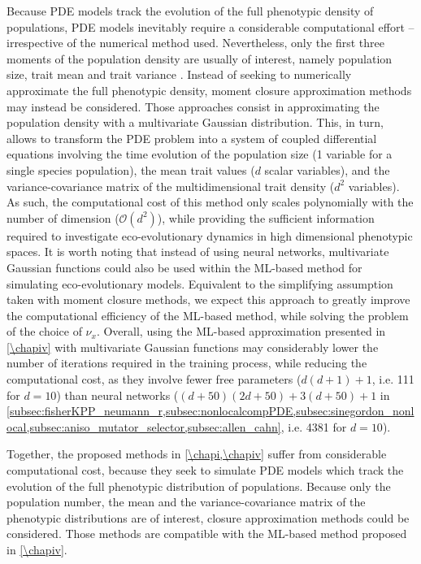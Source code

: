 Because PDE models track the evolution of the full phenotypic density of populations, PDE models inevitably require a considerable computational effort -- irrespective of the numerical method used. 
% 
Nevertheless, only the first three moments of the population density are usually of interest, namely population size, trait mean and trait variance \citep{Nordbotten2020}. 
% 
Instead of seeking to numerically approximate the full phenotypic density, moment closure approximation methods \citep{Wickman2021,Lion2022,Nordbotten2020} may instead be considered. Those approaches consist in approximating the population density with a multivariate Gaussian distribution. This, in turn, allows to transform the PDE problem into a system of coupled differential equations involving the time evolution of the population size (1 variable for a single species population), the mean trait values ($d$ scalar variables), and the variance-covariance matrix of the multidimensional trait density ($d^2$ variables). As such, the computational cost of this method only scales polynomially with the number of dimension ($\mathcal{O}(d^2)$), while providing the sufficient information required to investigate eco-evolutionary dynamics in high dimensional phenotypic spaces. 
% 
It is worth noting that instead of using neural networks, multivariate Gaussian functions could also be used within the ML-based method for simulating eco-evolutionary models. Equivalent to the simplifying assumption taken with moment closure methods, we expect this approach to greatly improve the computational efficiency of the ML-based method, while solving the problem of the choice of $\nu_x$. Overall, using the ML-based approximation presented in \cref{\chapiv} with multivariate Gaussian functions may considerably lower the number of iterations required in the training process, while reducing the computational cost, as they involve fewer free parameters ($d(d+1) + 1$, i.e. 111 for $d=10$) than neural networks ($(d+50)(2d+50) + 3(d+50) + 1$ in \cref{subsec:fisherKPP_neumann_r,subsec:nonlocalcompPDE,subsec:sinegordon_nonlocal,subsec:aniso_mutator_selector,subsec:allen_cahn}, i.e. 4381 for $d=10$).

Together, the proposed methods in \cref{\chapi,\chapiv} suffer from considerable computational cost, because they seek to simulate PDE models which track the evolution of the full phenotypic distribution of populations. Because only the population number, the mean and the variance-covariance matrix of the phenotypic distributions are of interest, closure approximation methods could be considered. Those methods are compatible with the ML-based method proposed in \cref{\chapiv}.


